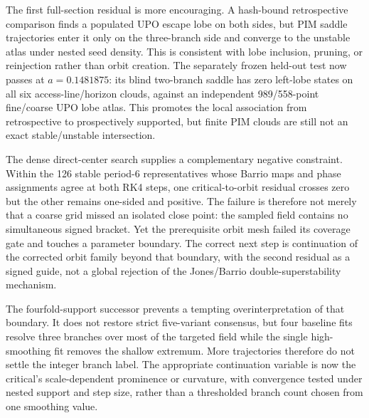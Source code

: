 The first full-section residual is more encouraging.  A hash-bound
retrospective comparison finds a populated UPO escape lobe on both sides, but
PIM saddle trajectories enter it only on the three-branch side and converge to
the unstable atlas under nested seed density.  This is consistent with lobe
inclusion, pruning, or reinjection rather than orbit creation.  The separately
frozen held-out test now passes at $a=0.1481875$: its blind two-branch saddle
has zero left-lobe states on all six access-line/horizon clouds, against an
independent 989/558-point fine/coarse UPO lobe atlas.  This promotes the local
association from retrospective to prospectively supported, but finite PIM
clouds are still not an exact stable/unstable intersection.

The dense direct-center search supplies a complementary negative constraint.
Within the 126 stable period-6 representatives whose Barrio maps and phase
assignments agree at both RK4 steps, one critical-to-orbit residual crosses
zero but the other remains one-sided and positive.  The failure is therefore
not merely that a coarse grid missed an isolated close point: the sampled
field contains no simultaneous signed bracket.  Yet the prerequisite orbit
mesh failed its coverage gate and touches a parameter boundary.  The correct
next step is continuation of the corrected orbit family beyond that boundary,
with the second residual as a signed guide, not a global rejection of the
Jones/Barrio double-superstability mechanism.

The fourfold-support successor prevents a tempting overinterpretation of that
boundary.  It does not restore strict five-variant consensus, but four baseline
fits resolve three branches over most of the targeted field while the single
high-smoothing fit removes the shallow extremum.  More trajectories therefore
do not settle the integer branch label.  The appropriate continuation variable
is now the critical's scale-dependent prominence or curvature, with convergence
tested under nested support and step size, rather than a thresholded branch
count chosen from one smoothing value.

